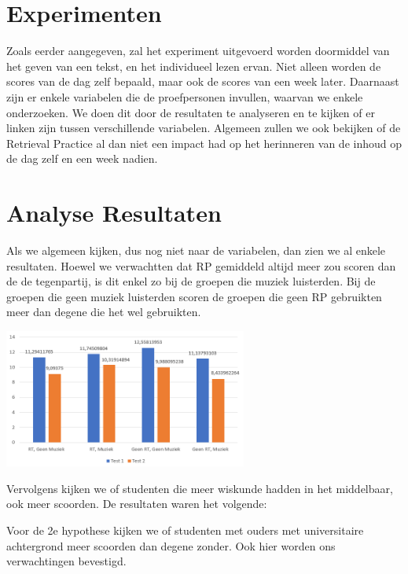 \documentclass{voorstel}
\begin{document}
	\section{Experimenten}
	\label{sec:Experimenten}
	
   Zoals eerder aangegeven, zal het experiment uitgevoerd worden doormiddel van het geven van een tekst, en het individueel lezen ervan. Niet alleen worden de scores van de dag zelf bepaald, maar ook de scores van een week later. Daarnaast zijn er enkele variabelen die de proefpersonen invullen, waarvan we enkele onderzoeken. We doen dit door de resultaten te analyseren en te kijken of er linken zijn tussen verschillende variabelen. Algemeen zullen we ook bekijken of de Retrieval Practice al dan niet een impact had op het herinneren van de inhoud op de dag zelf en een week nadien.
	
    
    \section{Analyse Resultaten}
    \label{sec:analyse_resultaten}
    
    Als we algemeen kijken, dus nog niet naar de variabelen, dan zien we al enkele resultaten. Hoewel we verwachtten dat RP gemiddeld altijd meer zou scoren dan de de tegenpartij, is dit enkel zo bij de groepen die muziek luisterden. Bij de groepen die geen muziek luisterden scoren de groepen die geen RP gebruikten meer dan degene die het wel gebruikten.

	\includegraphics[width=8cm]{img/algemeen.png}
    
    Vervolgens kijken we of studenten die meer wiskunde hadden in het middelbaar, ook meer scoorden. De resultaten waren het volgende:
    
    Voor de 2e hypothese kijken we of studenten met ouders met universitaire achtergrond meer scoorden dan degene zonder. Ook hier worden ons verwachtingen bevestigd.
    
\end{document}
